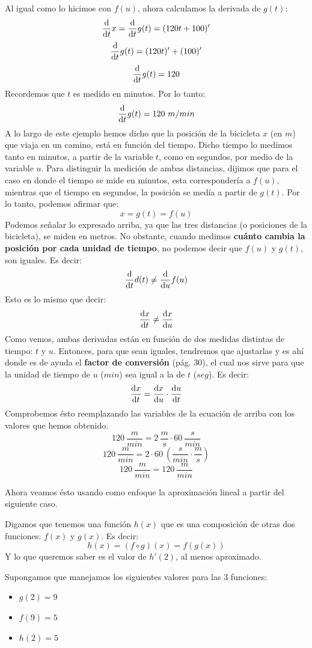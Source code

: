 \documentclass[12pt]{article}
\begin{document}
Al igual como lo hicimos con $f(u)$, ahora calculamos la derivada de $g(t)$:
\[\diff*{x}t = \diff*{g(t)}t = (120t + 100)'\]
\[\diff*{g(t)}t = (120t)' + (100)'\]
\[\diff*{g(t)}t = 120\]
Recordemos que $t$ es medido en minutos. Por lo tanto:
\[\diff*{g(t)}t = 120 \ m/min\]
A lo largo de este ejemplo hemos dicho que la posición de la bicicleta $x$ (en $m$) que viaja en un camino, está en función del tiempo. Dicho tiempo lo medimos tanto en minutos, a partir de la variable $t$, como en segundos, por medio de la variable $u$. Para distinguir la medición de ambas distancias, dijimos que para el caso en donde el tiempo se mide en minutos, esta correspondería a $f(u)$, mientras que el tiempo en segundos, la posición se medía a partir de $g(t)$. Por lo tanto, podemos afirmar que:
\[x = g(t) = f(u)\]
Podemos señalar lo expresado arriba, ya que las tres distancias (o posiciones de la bicicleta), se miden en metros. No obstante, cuando medimos \textbf{cuánto cambia la posición por cada unidad de tiempo}, no podemos decir que $f(u)$ y $g(t)$, son iguales. Es decir:
\[\diff*{d(t)}t \neq \diff*{f(u)}u\]
Esto es lo mismo que decir:
\[\diff{x}t \neq \diff{x}u\]
Como vemos, ambas derivadas están en función de dos medidas distintas de tiempo: $t$ y $u$. Entonces, para que sean iguales, tendremos que ajustarlas y es ahí donde es de ayuda el \textbf{factor de conversión} (pág. 30), el cual nos sirve para que la unidad de tiempo de $u$ ($min$) sea igual a la de $t$ ($seg$). Es decir:
\[\diff{x}t = \diff{x}u \cdot \diff{u}t\]
Comprobemos ésto reemplazando las variables de la ecuación de arriba con los valores que hemos obtenido.
\[120 \ \frac{m}{min} = 2 \ \frac{m}{s} \cdot 60 \ \frac{s}{min}\]
\[120 \ \frac{m}{min} = 2 \cdot 60 \ \left(\frac{s}{min} \cdot \frac{m}{s}\right)\]
\[120 \ \frac{m}{min} = 120 \ \frac{m}{min}\]

Ahora veamos ésto usando como enfoque la aproximación lineal a partir del siguiente caso. 

Digamos que tenemos una función $h(x)$ que es una composición de otras dos funciones: $f(x)$ y $g(x)$. Es decir:
\[h(x) = (f \circ g)(x) = f(g(x))\]
Y lo que queremos saber es el valor de $h'(2)$, al menos aproximado.

Supongamos que manejamos los siguientes valores para las 3 funciones:

\begin{itemize}
\item $g(2) = 9$
\item $f(9) = 5$
\item $h(2) = 5$
\end{itemize}
\end{document}
